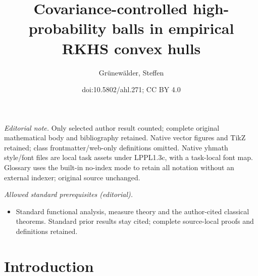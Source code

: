 \documentclass[10pt]{amsart}
\title{Covariance-controlled high-probability balls in empirical RKHS convex hulls}
\author{Grünewälder, Steffen}
\date{doi:10.5802/ahl.271; CC BY 4.0}
\theoremstyle{definition}\newtheorem{defi}[theo]{Definition}\newtheorem{rema}[theo]{Remark}\newtheorem{exam}[theo]{Example}\newtheorem{exem}[theo]{Example}\newtheorem{nota}[theo]{Notation}
\theoremstyle{remark}
\begin{document}
\maketitle
\noindent\textit{Editorial note.} Only selected author result counted; complete original mathematical body and bibliography retained. Native vector figures and TikZ retained; class frontmatter/web-only definitions omitted. Native yhmath style/font files are local task assets under LPPL1.3c, with a task-local font map. Glossary uses the built-in no-index mode to retain all notation without an external indexer; original source unchanged.\par\medskip
\noindent\textit{Allowed standard prerequisites (editorial).}\begin{itemize}
\item Standard functional analysis, measure theory and the author-cited classical theorems. Standard prior results stay cited; complete source-local proofs and definitions retained.
\end{itemize}\medskip
\tableofcontents



\section{Introduction}
\end{document}
